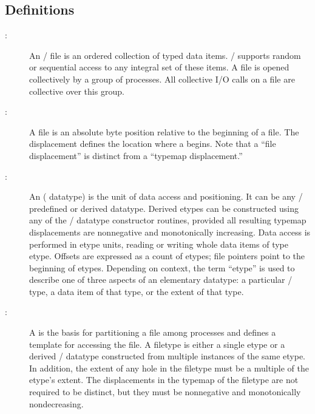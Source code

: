 \subsection{Definitions}
\label{subsec:io-2:definitions}
\begin{description}

\item[:]
An \MPI/ file is an ordered collection of typed data items.
\MPI/ supports random or sequential access to any integral set of these items.
A file is opened collectively by a group of processes.
All collective I/O calls on a file are collective over this group.

\item[:]
A file  is an absolute byte position
relative to the beginning of a file.
The displacement defines the location where a  begins.
Note that a ``file displacement'' is distinct from a ``typemap displacement.''

\item[:]
An  ( datatype)
is the unit of data access and positioning.
It can be any \MPI/ predefined or derived datatype.
Derived etypes can be constructed
using any of the \MPI/ datatype constructor routines,
provided all resulting typemap displacements are nonnegative
and monotonically increasing.
Data access is performed in etype units,
reading or writing whole data items of type etype.
Offsets are expressed as a count of etypes;
file pointers point to the beginning of etypes.
Depending on context,
the term ``etype'' is used to describe one of three aspects
of an elementary datatype:
a particular \MPI/ type,
a data item of that type,
or the extent of that type.

\item[:]
A  is the basis for partitioning a file among processes
and defines a template for accessing the file.
A filetype is either a single etype or a derived \MPI/ datatype
constructed from multiple instances of the same etype.
In addition,
the extent of any hole in the filetype
must be a multiple of the etype's extent.
The displacements in the typemap of the filetype are not required to be distinct,
but they must be nonnegative and monotonically nondecreasing.


\end{description}
